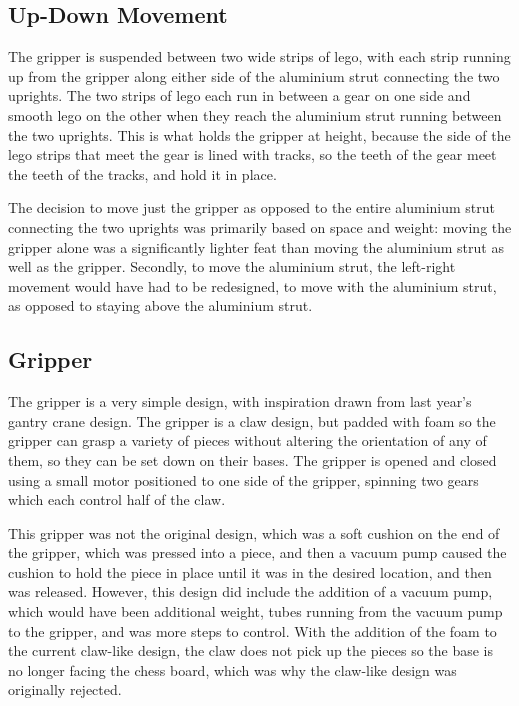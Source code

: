 \documentclass[onecolumn]{IEEEtran}
\begin{document}
\subsection{Up-Down Movement}
The gripper is suspended between two wide strips of lego, with each strip running up from the gripper along either side of the aluminium strut connecting the two uprights. The two strips of lego each run in between a gear on one side and smooth lego on the other when they reach the aluminium strut running between the two uprights. This is what holds the gripper at height, because the side of the lego strips that meet the gear is lined with tracks, so the teeth of the gear meet the teeth of the tracks, and hold it in place. \par
The decision to move just the gripper as opposed to the entire aluminium strut connecting the two uprights was primarily based on space and weight: moving the gripper alone was a significantly lighter feat than moving the aluminium strut as well as the gripper. Secondly, to move the aluminium strut, the left-right movement would have had to be redesigned, to move with the aluminium strut, as opposed to staying above the aluminium strut. \par
\subsection{Gripper}
The gripper is a very simple design, with inspiration drawn from last year's gantry crane design. The gripper is a claw design, but padded with foam so the gripper can grasp a variety of pieces without altering the orientation of any of them, so they can be set down on their bases. The gripper is opened and closed using a small motor positioned to one side of the gripper, spinning two gears which each control half of the claw. \par
This gripper was not the original design, which was a soft cushion on the end of the gripper, which was pressed into a piece, and then a vacuum pump caused the cushion to hold the piece in place until it was in the desired location, and then was released. However, this design did include the addition of a vacuum pump, which would have been additional weight, tubes running from the vacuum pump to the gripper, and was more steps to control. With the addition of the foam to the current claw-like design, the claw does not pick up the pieces so the base is no longer facing the chess board, which was why the claw-like design was originally rejected. \par
\end{document}
